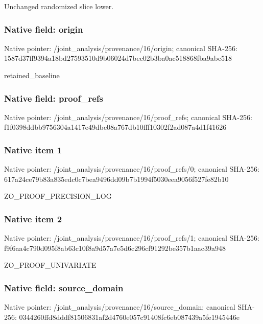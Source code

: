 \documentclass[10pt,a4paper]{article}
\begin{document}
\begingroup\raggedright\sloppy Unchanged randomized slice lower.\par\endgroup

\subsubsection{Native field: origin}
Native pointer: /joint\_\allowbreak{}analysis/provenance/16/origin; canonical SHA-256: 1587d37ff9394a18bd27593510d9b06024d7bec02b3ba0ac518868fba9abc518

\begingroup\raggedright\sloppy retained\_\allowbreak{}baseline\par\endgroup

\subsubsection{Native field: proof\_\allowbreak{}refs}
Native pointer: /joint\_\allowbreak{}analysis/provenance/16/proof\_\allowbreak{}refs; canonical SHA-256: f1f0398ddbb9756304a1417e49dbe08a767db10fff10302f2ad087a4d1f41626

\subsubsection{Native item 1}
Native pointer: /joint\_\allowbreak{}analysis/provenance/16/proof\_\allowbreak{}refs/0; canonical SHA-256: 617a24ce79b83a835edc0c7bea9496dd09b7b1994f5030eea9056f527fe82b10

\begingroup\raggedright\sloppy ZO\_\allowbreak{}PROOF\_\allowbreak{}PRECISION\_\allowbreak{}LOG\par\endgroup

\subsubsection{Native item 2}
Native pointer: /joint\_\allowbreak{}analysis/provenance/16/proof\_\allowbreak{}refs/1; canonical SHA-256: f9f6aa4c790d095f8ab63c10f8a9d57a7e5d6c296cf91292be357b1aac39a948

\begingroup\raggedright\sloppy ZO\_\allowbreak{}PROOF\_\allowbreak{}UNIVARIATE\par\endgroup

\subsubsection{Native field: source\_\allowbreak{}domain}
Native pointer: /joint\_\allowbreak{}analysis/provenance/16/source\_\allowbreak{}domain; canonical SHA-256: 0344260ffd8dddf81506831af2d4760e057c91408fc6eb087439a5fe1945446e
\end{document}
